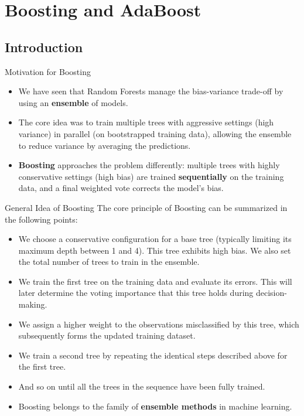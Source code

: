 \section[Boosting and AdaBoost]{Boosting and AdaBoost}

\subsection[Introduction]{Introduction}

\begin{frame}{Motivation for Boosting}
	\begin{itemize}
		\item We have seen that Random Forests manage the bias-variance trade-off by using an \textbf{ensemble} of models.
		\item The core idea was to train multiple trees with aggressive settings (high variance) in parallel (on bootstrapped training data), allowing the ensemble to reduce variance by averaging the predictions.
		\item \textbf{Boosting} approaches the problem differently: multiple trees with highly conservative settings (high bias) are trained \textbf{sequentially} on the training data, and a final weighted vote corrects the model's bias.
	\end{itemize}
\end{frame}

\begin{frame}{General Idea of Boosting}
	The core principle of Boosting can be summarized in the following points:
	\begin{itemize}
		\item We choose a conservative configuration for a base tree (typically limiting its maximum depth between 1 and 4). This tree exhibits high bias. We also set the total number of trees to train in the ensemble.
		\pause
		\item We train the first tree on the training data and evaluate its errors. This will later determine the voting importance that this tree holds during decision-making.
		\pause
		\item We assign a higher weight to the observations misclassified by this tree, which subsequently forms the updated training dataset.
		\pause
		\item We train a second tree by repeating the identical steps described above for the first tree.
		\pause
		\item And so on until all the trees in the sequence have been fully trained.
		\pause
		\item Boosting belongs to the family of \textbf{ensemble methods} in machine learning.
	\end{itemize}
\end{frame}

